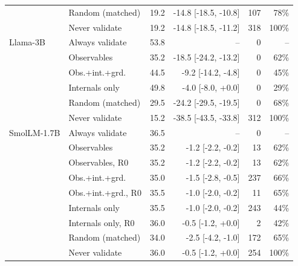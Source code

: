 \begin{table}[!tbp]
{\begin{tabular}{llrrrr}
 & Random (matched) & 19.2 & -14.8 [-18.5, -10.8] & 107 & 78\% \\
 & Never validate & 19.2 & -14.8 [-18.5, -11.2] & 318 & 100\% \\
\midrule
Llama-3B & Always validate & 53.8 & -- & 0 & -- \\
 & Observables & 35.2 & -18.5 [-24.2, -13.2] & 0 & 62\% \\
 & Obs.+int.+grd. & 44.5 & -9.2 [-14.2, -4.8] & 0 & 45\% \\
 & Internals only & 49.8 & -4.0 [-8.0, +0.0] & 0 & 29\% \\
 & Random (matched) & 29.5 & -24.2 [-29.5, -19.5] & 0 & 68\% \\
 & Never validate & 15.2 & -38.5 [-43.5, -33.8] & 312 & 100\% \\
\midrule
SmolLM-1.7B & Always validate & 36.5 & -- & 0 & -- \\
 & Observables & 35.2 & -1.2 [-2.2, -0.2] & 13 & 62\% \\
 & Observables, R0 & 35.2 & -1.2 [-2.2, -0.2] & 13 & 62\% \\
 & Obs.+int.+grd. & 35.0 & -1.5 [-2.8, -0.5] & 237 & 66\% \\
 & Obs.+int.+grd., R0 & 35.5 & -1.0 [-2.0, -0.2] & 11 & 65\% \\
 & Internals only & 35.5 & -1.0 [-2.0, -0.2] & 243 & 44\% \\
 & Internals only, R0 & 36.0 & -0.5 [-1.2, +0.0] & 2 & 42\% \\
 & Random (matched) & 34.0 & -2.5 [-4.2, -1.0] & 172 & 65\% \\
 & Never validate & 36.0 & -0.5 [-1.2, +0.0] & 254 & 100\% \\
\bottomrule
\end{tabular}}
\end{table}

